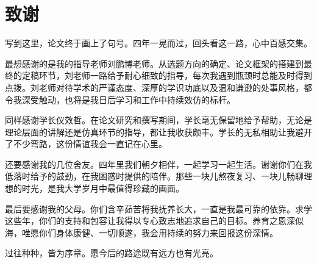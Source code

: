 \documentclass[12pt,openany,oneside]{ctexbook}
\begin{document}

\renewcommand{\thechapter}{\arabic{chapter}}
\renewcommand{\chaptername}{第\ \thechapter\ 章}

\setcounter{page}{1}

\titleformat{\chapter}{\centering\sanhao\heiti\bfseries}{\chaptername}{0.8em}{}



\setcounter{page}{1}


\chapter*{\sanhao\heiti\textbf{致\qquad 谢}}

写到这里，论文终于画上了句号。四年一晃而过，回头看这一路，心中百感交集。

最想感谢的是我的指导老师刘鹏博老师。从选题方向的确定、论文框架的搭建到最终的定稿环节，刘老师一路给予耐心细致的指导，每次我遇到瓶颈时总能及时得到点拨。刘老师对待学术的严谨态度、深厚的学识功底以及温和谦逊的处事风格，都令我深受触动，也将是我日后学习和工作中持续效仿的标杆。

同样感谢学长仪效哲。在论文研究和撰写期间，学长毫无保留地给予帮助，无论是理论层面的讲解还是仿真环节的指导，都让我收获颇丰。学长的无私相助让我避开了不少弯路，这份情谊我会一直记在心里。

还要感谢我的几位舍友。四年里我们朝夕相伴，一起学习一起生活。谢谢你们在我低落时给予的鼓劲，在我困惑时提供的陪伴。那些一块儿熬夜复习、一块儿畅聊理想的时光，是我大学岁月中最值得珍藏的画面。

最后要感谢我的父母。你们含辛茹苦将我抚养长大，一直是我最可靠的依靠。求学这些年，你们的支持和包容让我得以专心致志地追求自己的目标。养育之恩深似海，唯愿你们身体康健、一切顺遂，我会用持续的努力来回报这份深情。

过往种种，皆为序章。愿今后的路途既有远方也有光亮。
\end{document}
